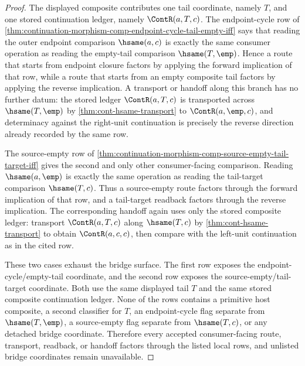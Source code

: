 \begin{proof}
The displayed composite contributes one tail coordinate, namely $T$, and one
stored continuation ledger, namely $\ContR(a,T,c)$. The endpoint-cycle row of
\autoref{thm:continuation-morphism-comp-endpoint-cycle-tail-empty-iff} says that
reading the outer endpoint comparison $\hsame(a,c)$ is exactly the same
consumer operation as reading the empty-tail comparison $\hsame(T,\emp)$. Hence
a route that starts from endpoint closure factors by applying the forward
implication of that row, while a route that starts from an empty composite tail
factors by applying the reverse implication. A transport or handoff along this
branch has no further datum: the stored ledger $\ContR(a,T,c)$ is transported
across $\hsame(T,\emp)$ by \autoref{thm:cont-hsame-transport} to
$\ContR(a,\emp,c)$, and determinacy against the right-unit continuation is
precisely the reverse direction already recorded by the same row.

The source-empty row of
\autoref{thm:continuation-morphism-comp-source-empty-tail-target-iff} gives the
second and only other consumer-facing comparison. Reading $\hsame(a,\emp)$ is
exactly the same operation as reading the tail-target comparison
$\hsame(T,c)$. Thus a source-empty route factors through the forward implication
of that row, and a tail-target readback factors through the reverse implication.
The corresponding handoff again uses only the stored composite ledger: transport
$\ContR(a,T,c)$ along $\hsame(T,c)$ by \autoref{thm:cont-hsame-transport} to
obtain $\ContR(a,c,c)$, then compare with the left-unit continuation as in the
cited row.

These two cases exhaust the bridge surface. The first row exposes the
endpoint-cycle/empty-tail coordinate, and the second row exposes the
source-empty/tail-target coordinate. Both use the same displayed tail $T$ and
the same stored composite continuation ledger. None of the rows contains a
primitive host composite, a second classifier for $T$, an endpoint-cycle flag
separate from $\hsame(T,\emp)$, a source-empty flag separate from $\hsame(T,c)$,
or any detached bridge coordinate. Therefore every accepted consumer-facing
route, transport, readback, or handoff factors through the listed local rows,
and unlisted bridge coordinates remain unavailable.
\end{proof}


